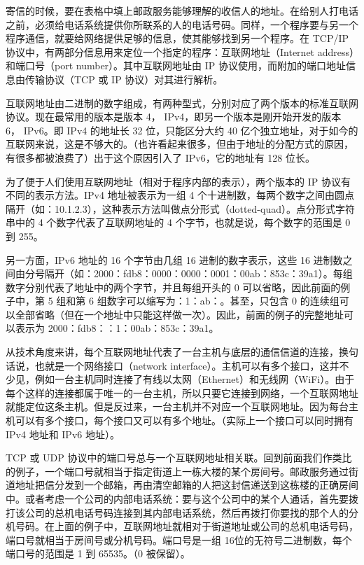 		寄信的时候，要在表格中填上邮政服务能够理解的收信人的地址。在给别人打电话之前，必须给电话系统提供你所联系的人的电话号码。同样，一个程序要与另一个程序通信，就要给网络提供足够的信息，使其能够找到另一个程序。在 TCP/IP 协议中，有两部分信息用来定位一个指定的程序：互联网地址（Internet address）和端口号（port number）。其中互联网地址由 IP 协议使用，而附加的端口地址信息由传输协议（TCP 或 IP 协议）对其进行解析。

		互联网地址由二进制的数字组成，有两种型式，分别对应了两个版本的标准互联网协议。现在最常用的版本是版本 4， IPv4，即另一个版本是刚开始开发的版本 6， IPv6。即 IPv4 的地址长 32 位，只能区分大约 40 亿个独立地址，对于如今的互联网来说，这是不够大的。（也许看起来很多，但由于地址的分配方式的原因，有很多都被浪费了）出于这个原因引入了 IPv6，它的地址有 128 位长。

		为了便于人们使用互联网地址（相对于程序内部的表示），两个版本的 IP 协议有不同的表示方法。IPv4 地址被表示为一组 4 个十进制数，每两个数字之间由圆点隔开（如：10.1.2.3），这种表示方法叫做点分形式（dotted-quad）。点分形式字符串中的 4 个数字代表了互联网地址的 4 个字节，也就是说，每个数字的范围是 0 到 255。

		另一方面，IPv6 地址的 16 个字节由几组 16 进制的数字表示，这些 16 进制数之间由分号隔开（如：2000：fdb8：0000：0000：0001：00ab：853c：39a1）。每组数字分别代表了地址中的两个字节，并且每组开头的 0 可以省略，因此前面的例子中，第 5 组和第 6 组数字可以缩写为：1：ab：。甚至，只包含 0 的连续组可以全部省略（但在一个地址中只能这样做一次）。因此，前面的例子的完整地址可以表示为 2000：fdb8：：1：00ab：853c：39a1。

		从技术角度来讲，每个互联网地址代表了一台主机与底层的通信信道的连接，换句话说，也就是一个网络接口（network interface）。主机可以有多个接口，这并不少见，例如一台主机同时连接了有线以太网（Ethernet）和无线网（WiFi）。由于每个这样的连接都属于唯一的一台主机，所以只要它连接到网络，一个互联网地址就能定位这条主机。但是反过来，一台主机并不对应一个互联网地址。因为每台主机可以有多个接口，每个接口又可以有多个地址。（实际上一个接口可以同时拥有 IPv4 地址和 IPv6 地址）。

		TCP 或 UDP 协议中的端口号总与一个互联网地址相关联。回到前面我们作类比的例子，一个端口号就相当于指定街道上一栋大楼的某个房间号。邮政服务通过街道地址把信分发到一个邮箱，再由清空邮箱的人把这封信递送到这栋楼的正确房间中。或者考虑一个公司的内部电话系统：要与这个公司中的某个人通话，首先要拨打该公司的总机电话号码连接到其内部电话系统，然后再拨打你要找的那个人的分机号码。在上面的例子中，互联网地址就相对于街道地址或公司的总机电话号码，端口号就相当于房间号或分机号码。端口号是一组 16位的无符号二进制数，每个端口号的范围是 1 到 65535。（0 被保留）。

